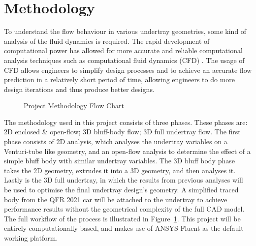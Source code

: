 \section{Methodology}
To understand the flow behaviour in various undertray geometries, some kind of analysis of the fluid dynamics is required. The rapid development of computational power has allowed for more accurate and reliable computational analysis techniques such as computational fluid dynamics (CFD) \cite{Andersson2011ComputationalEngineers}. The usage of CFD allows engineers to simplify design processes and to achieve an accurate flow prediction in a relatively short period of time, allowing engineers to do more design iterations and thus produce better designs.

\begin{figure}[!htb]
    \centering
    \caption{Project Methodology Flow Chart}
    \label{fig:project methodology}
\end{figure}

\noindent The methodology used in this project consists of three phases. These phases are: 2D enclosed \& open-flow; 3D bluff-body flow; 3D full undertray flow. The first phase consists of 2D analysis, which analyses the undertray variables on a Venturi-tube like geometry, and an open-flow analysis to determine the effect of a simple bluff body with similar undertray variables. The 3D bluff body phase takes the 2D geometry, extrudes it into a 3D geometry, and then analyses it. Lastly is the 3D full undertray, in which the results from previous analyses will be used to optimise the final undertray design's geometry. A simplified traced body from the QFR 2021 car will be attached to the undertray to achieve performance results without the geometrical complexity of the full CAD model. The full workflow of the process is illustrated in Figure~\ref{fig:project methodology}. This project will be entirely computationally based, and makes use of ANSYS Fluent as the default working platform.


